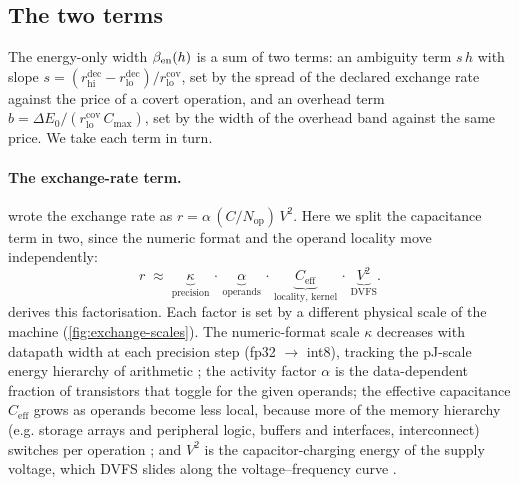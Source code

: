 \documentclass{article}
\theoremstyle{plain}
\theoremstyle{definition}
\theoremstyle{remark}
\begin{document}
\subsection{The two terms}
\label{subsec:factors}

The energy-only width $\beta_{\rm en}(h)$ is a sum of two terms: an ambiguity term
$s\,h$ with slope
$s = (r_{\mathrm{hi}}^{\mathrm{dec}} - r_{\mathrm{lo}}^{\mathrm{dec}})/r_{\mathrm{lo}}^{\mathrm{cov}}$,
set by the spread of the declared exchange rate against the price of a covert
operation, and an overhead term
$b = \Delta E_0/(r_{\mathrm{lo}}^{\mathrm{cov}}\,C_{\max})$, set by the width of
the overhead band against the same price. We take each term in turn.

\paragraph{The exchange-rate term.}
 wrote the exchange rate as
$r = \alpha\,(C/N_{\mathrm{op}})\,V^2$. Here we split the capacitance term in
two, since the numeric format and the operand locality move independently:
\begin{equation}
	r \;\approx\;
	\underbrace{\kappa}_{\text{precision}} \,\cdot\,
	\underbrace{\alpha}_{\text{operands}} \,\cdot\,
	\underbrace{C_{\mathrm{eff}}}_{\text{locality, kernel}} \,\cdot\,
	\underbrace{V^2}_{\text{DVFS}}.
	\label{eq:cmos}
\end{equation}
 derives this factorisation. Each factor is set by a different physical scale of the
machine (\cref{fig:exchange-scales}). The numeric-format scale $\kappa$ decreases
with datapath width at each precision step (fp32 $\to$ int8), tracking the
pJ-scale energy hierarchy of arithmetic \citep{horowitz2014computing}; the
activity factor $\alpha$ is the data-dependent fraction of transistors that
toggle for the given operands; the effective capacitance $C_{\mathrm{eff}}$
grows as operands become less local, because more of the memory
hierarchy (e.g. storage arrays and peripheral logic, buffers and interfaces,
interconnect) switches per operation
\citep{horowitz2014computing,chatterjee2017architecting}; and $V^2$ is the
capacitor-charging energy of the supply voltage, which DVFS slides along the
voltage--frequency curve \citep{pallipadi2006ondemand}.
\end{document}
